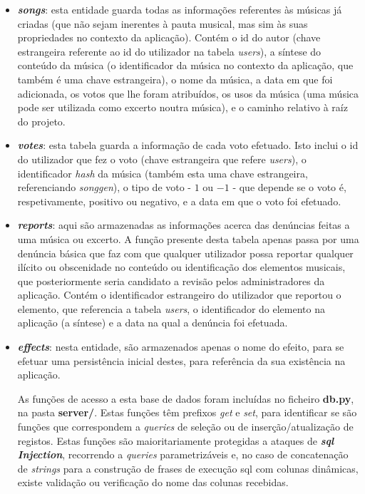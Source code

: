 \documentclass{report}
\begin{document}
\begin{itemize}
\item \textbf{\textit{songs}}: esta entidade guarda todas as informações referentes às músicas já criadas (que não sejam inerentes à pauta musical, mas sim às suas propriedades no contexto da aplicação). Contém o id do autor (chave estrangeira referente ao id do utilizador na tabela \textit{users}), a síntese do conteúdo da música (o identificador da música no contexto da aplicação, que também é uma chave estrangeira), o nome da música, a data em que foi adicionada, os votos que lhe foram atribuídos, os usos da música (uma música pode ser utilizada como excerto noutra música), e o caminho relativo à raíz do projeto.

\item \textbf{\textit{votes}}: esta tabela guarda a informação de cada voto efetuado. Isto inclui o id do utilizador que fez o voto (chave estrangeira que refere \textit{users}), o identificador \textit{hash} da música (também esta uma chave estrangeira, referenciando \textit{songgen}), o tipo de voto - $1$ ou $-1$ - que depende se o voto é, respetivamente, positivo ou negativo, e a data em que o voto foi efetuado.

\item \textbf{\textit{reports}}: aqui são armazenadas as informações acerca das denúncias feitas a uma música ou excerto. A função presente desta tabela apenas passa por uma denúncia básica que faz com que qualquer utilizador possa reportar qualquer ilícito ou obscenidade no conteúdo ou identificação dos elementos musicais, que posteriormente seria candidato a revisão pelos administradores da aplicação. Contém o identificador estrangeiro do utilizador que reportou o elemento, que referencia a tabela \textit{users}, o identificador do elemento na aplicação (a síntese) e a data na qual a denúncia foi efetuada.

\item \textbf{\textit{effects}}: nesta entidade, são armazenados apenas o nome do efeito, para se efetuar uma persistência inicial destes, para referência da sua existência na aplicação.

As funções de acesso a esta base de dados foram incluídas no ficheiro \textbf{db.py}, na pasta \textbf{server/}. Estas funções têm prefixos \textit{get} e \textit{set}, para identificar se são funções que correspondem a \textit{queries} de seleção ou de inserção/atualização de registos. Estas funções são maioritariamente protegidas a ataques de \textbf{\textit{\ac{sql} Injection}}, recorrendo a \textit{queries} parametrizáveis e, no caso de concatenação de \textit{strings} para a construção de frases de execução \ac{sql} com colunas dinâmicas, existe validação ou verificação do nome das colunas recebidas.
\end{itemize}
\end{document}
